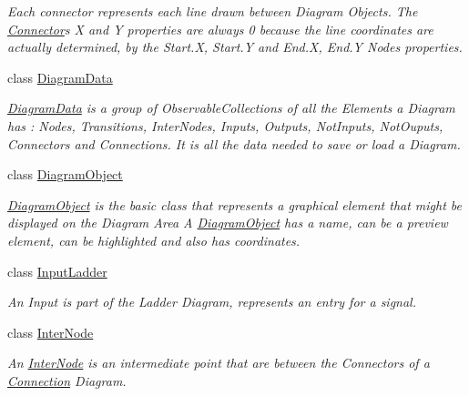 \begin{DoxyCompactItemize}
\begin{DoxyCompactList}\small\item\em Each connector represents each line drawn between Diagram Objects. The \hyperlink{class_prototipo_t_f_g_1_1_connector}{Connector}\textquotesingle{}s X and Y properties are always 0 because the line coordinates are actually determined, by the Start.\+X, Start.\+Y and End.\+X, End.\+Y Nodes\textquotesingle{} properties. \end{DoxyCompactList}\item 
class \hyperlink{class_prototipo_t_f_g_1_1_diagram_data}{Diagram\+Data}
\begin{DoxyCompactList}\small\item\em \hyperlink{class_prototipo_t_f_g_1_1_diagram_data}{Diagram\+Data} is a group of Observable\+Collections of all the Elements a Diagram has \+: Nodes, Transitions, Inter\+Nodes, Inputs, Outputs, Not\+Inputs, Not\+Ouputs, Connectors and Connections. It is all the data needed to save or load a Diagram. \end{DoxyCompactList}\item 
class \hyperlink{class_prototipo_t_f_g_1_1_diagram_object}{Diagram\+Object}
\begin{DoxyCompactList}\small\item\em \hyperlink{class_prototipo_t_f_g_1_1_diagram_object}{Diagram\+Object} is the basic class that represents a graphical element that might be displayed on the Diagram Area A \hyperlink{class_prototipo_t_f_g_1_1_diagram_object}{Diagram\+Object} has a name, can be a preview element, can be highlighted and also has coordinates. \end{DoxyCompactList}\item 
class \hyperlink{class_prototipo_t_f_g_1_1_input_ladder}{Input\+Ladder}
\begin{DoxyCompactList}\small\item\em An Input is part of the Ladder Diagram, represents an entry for a signal. \end{DoxyCompactList}\item 
class \hyperlink{class_prototipo_t_f_g_1_1_inter_node}{Inter\+Node}
\begin{DoxyCompactList}\small\item\em An \hyperlink{class_prototipo_t_f_g_1_1_inter_node}{Inter\+Node} is an intermediate point that are between the Connectors of a \hyperlink{class_prototipo_t_f_g_1_1_connection}{Connection} Diagram. \end{DoxyCompactList}\item 

\end{DoxyCompactItemize}
